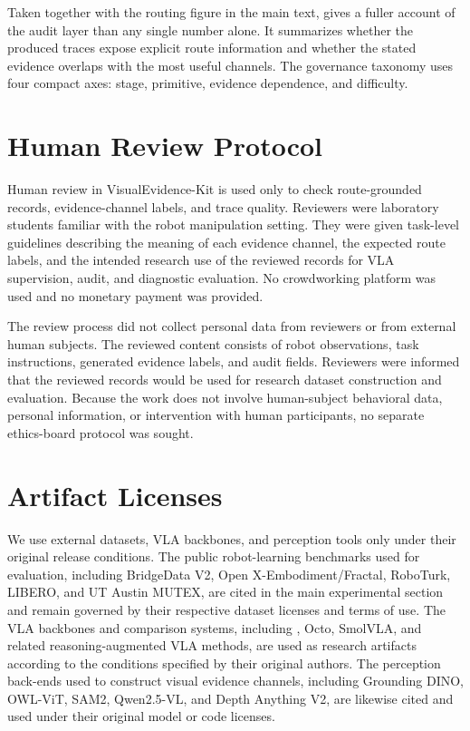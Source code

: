 Taken together with the routing figure in the main text,  gives a fuller account of the audit layer than any single number alone. It summarizes whether the produced traces expose explicit route information and whether the stated evidence overlaps with the most useful channels. The governance taxonomy uses four compact axes: stage, primitive, evidence dependence, and difficulty.

\section{Human Review Protocol}

Human review in VisualEvidence-Kit is used only to check route-grounded records, evidence-channel labels, and trace quality. Reviewers were laboratory students familiar with the robot manipulation setting. They were given task-level guidelines describing the meaning of each evidence channel, the expected route labels, and the intended research use of the reviewed records for VLA supervision, audit, and diagnostic evaluation. No crowdworking platform was used and no monetary payment was provided.

The review process did not collect personal data from reviewers or from external human subjects. The reviewed content consists of robot observations, task instructions, generated evidence labels, and audit fields. Reviewers were informed that the reviewed records would be used for research dataset construction and evaluation. Because the work does not involve human-subject behavioral data, personal information, or intervention with human participants, no separate ethics-board protocol was sought.


\section{Artifact Licenses}

We use external datasets, VLA backbones, and perception tools only under their original release conditions. The public robot-learning benchmarks used for evaluation, including BridgeData V2, Open X-Embodiment/Fractal, RoboTurk, LIBERO, and UT Austin MUTEX, are cited in the main experimental section and remain governed by their respective dataset licenses and terms of use. The VLA backbones and comparison systems, including \openvla{}, Octo, SmolVLA, and related reasoning-augmented VLA methods, are used as research artifacts according to the conditions specified by their original authors. The perception back-ends used to construct visual evidence channels, including Grounding DINO, OWL-ViT, SAM2, Qwen2.5-VL, and Depth Anything V2, are likewise cited and used under their original model or code licenses.

